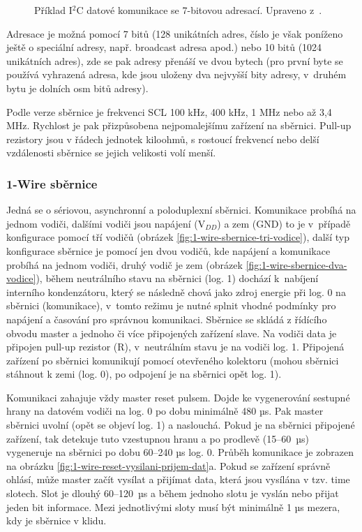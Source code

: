\begin{figure}[H]
    \centering
    \def\svgwidth{\columnwidth}
    
    \caption[Příklad I$^2$C datové komunikace se 7-bitovou adresací.]{Příklad I$^2$C datové komunikace se 7-bitovou adresací. Upraveno z~\cite{i2c-sbernice-datovy-paket-7bit-adresa}.}
    \label{fig:i2c-sbernice-datova-komunikace-7bit-adresa}
\end{figure}

Adresace je možná pomocí 7 bitů (128 unikátních adres, číslo je však poníženo ještě o speciální adresy, např. broadcast adresa apod.) nebo 10 bitů (1024 unikátních adres), zde se pak adresy přenáší ve dvou bytech (pro první byte se používá vyhrazená adresa, kde jsou uloženy dva nejvyšší bity adresy, v~druhém bytu je dolních osm bitů adresy).

Podle verze sběrnice je frekvenci SCL 100 kHz, 400 kHz, 1 MHz nebo až 3,4 MHz. Rychlost je pak přizpůsobena nejpomalejšímu zařízení na sběrnici. Pull-up rezistory jsou v řádech jednotek kiloohmů, s rostoucí frekvencí nebo delší vzdálenosti sběrnice se jejich velikosti volí menší.




\subsubsection{1-Wire sběrnice}
\label{sec:1-wire-sbernice}
Jedná se o sériovou, asynchronní a poloduplexní sběrnici. Komunikace probíhá na jednom vodiči, dalšími vodiči jsou napájení (V$_{DD}$) a zem (GND) to je v~případě konfigurace pomocí tří vodičů (obrázek \ref{fig:1-wire-sbernice-tri-vodice}), další typ konfigurace sběrnice je pomocí jen dvou vodičů, kde napájení a komunikace probíhá na jednom vodiči, druhý vodič je zem (obrázek \ref{fig:1-wire-sbernice-dva-vodice}), během neutrálního stavu na sběrnici (log. 1) dochází k~nabíjení interního kondenzátoru, který se následně chová jako zdroj energie při log. 0 na sběrnici (komunikace), v~tomto režimu je nutné splnit vhodné podmínky pro napájení a časování pro správnou komunikaci. Sběrnice se skládá z řídícího obvodu master a jednoho či více připojených zařízení slave. Na vodiči data je připojen pull-up rezistor (R), v~neutrálním stavu je na vodiči log. 1. Připojená zařízení po sběrnici komunikují pomocí otevřeného kolektoru (mohou sběrnici stáhnout k zemi (log. 0), po odpojení je na sběrnici opět log. 1).

Komunikaci zahajuje vždy master reset pulsem. Dojde ke vygenerování sestupné hrany na datovém vodiči na log. 0 po dobu minimálně 480 µs. Pak master sběrnici uvolní (opět se objeví log. 1) a naslouchá. Pokud je na sběrnici připojené zařízení, tak detekuje tuto vzestupnou hranu a po prodlevě (15–60~µs) vygeneruje na sběrnici po dobu 60–240 µs log. 0. Průběh komunikace je zobrazen na obrázku \ref{fig:1-wire-reset-vysilani-prijem-dat}a. Pokud se zařízení správně ohlásí, může master začít vysílat a přijímat data, která jsou vysílána v tzv. time slotech. Slot je dlouhý 60–120~µs a během jednoho slotu je vyslán nebo přijat jeden bit informace. Mezi jednotlivými sloty musí být minimálně 1 µs mezera, kdy je sběrnice v klidu. 

